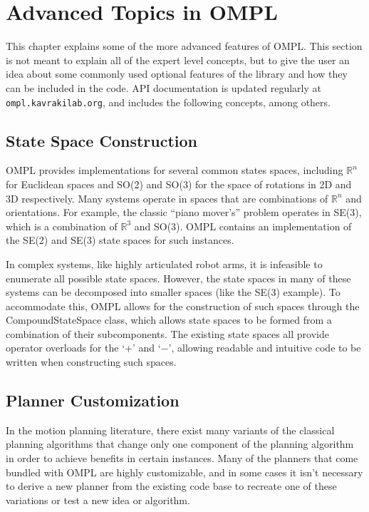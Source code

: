 \chapter{Advanced Topics in OMPL}

This chapter explains some of the more advanced features of OMPL.  This section
is not meant to explain all of the expert level concepts, but to give the user
an idea about some commonly used optional features of the library and how they
can be included in the code.  API documentation is updated regularly at
{\tt ompl.kavrakilab.org}, and includes the following concepts, among others.

\section {State Space Construction}
OMPL provides implementations for several common states spaces, including
${\mathbb R}^n$ for Euclidean spaces and SO(2) and SO(3) for the space of
rotations in 2D and 3D respectively.  Many systems operate in spaces
that are combinations of ${\mathbb R}^n$ and orientations.  For example, the
classic ``piano mover's'' problem operates in SE(3), which is a combination
of ${\mathbb R}^3$ and SO(3).  OMPL contains an implementation of the SE(2) and
SE(3) state spaces for such instances.

In complex systems, like highly articulated robot arms, it is infeasible to
enumerate all possible state spaces.  However, the state spaces in many of these
systems can be decomposed into smaller spaces (like the SE(3) example).  To
accommodate this, OMPL allows for the construction of such spaces through the
CompoundStateSpace class, which allows state spaces to be formed from a
combination of their subcomponents.  The existing state spaces all provide
operator overloads for the `+' and `$-$', allowing readable and intuitive code to
be written when constructing such spaces.

\section {Planner Customization}
In the motion planning literature, there exist many variants of the classical
planning algorithms that change only one component of the planning algorithm
in order to achieve benefits in certain instances.  Many of the planners that
come bundled with OMPL are highly customizable, and in some cases it isn't
necessary to derive a new planner from the existing code base to recreate one of
these variations or test a new idea or algorithm.

